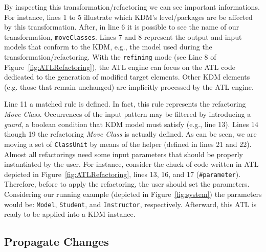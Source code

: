 By inspecting this transformation/refactoring we can see important informations. For instance, lines 1 to 5 illustrate which KDM's level/packages are be affected by this transformation.  After, in line 6 it is possible to see the name of our transformation, \texttt{moveClasses}. Lines 7 and 8 represent the output and input models that conform to the KDM, e.g., the model used during the transformation/refactoring. 
%
With the \texttt{refining} mode (see Line 8 of Figure~\ref{fig:ATLRefactoring}), the ATL engine can focus on the ATL code dedicated to the generation of modified target elements. Other KDM elements (e.g. those that remain unchanged) are implicitly processed by the ATL engine.


Line 11 a matched rule is defined. In fact, this rule represents the refactoring \textit{Move Class}. Occurrences of the input pattern may be filtered by introducing a \textit{guard}, a boolean condition that KDM model must satisfy (e.g., line 13). Lines 14 though 19 the refactoring \textit{Move Class} is actually defined. As can be seen, we are moving a set of \texttt{ClassUnit} by means of the helper (defined in lines 21 and 22). 
Almost all refactorings need some input parameters that should be properly instantiated by the user. For instance, consider the chuck of code written in ATL depicted in Figure~\ref{fig:ATLRefactoring}, lines 13, 16, and 17 (\texttt{\#parameter}). Therefore, before to apply the refactoring, the user should set the parameters. Considering our running example (depicted in Figure~\ref{fig:system}) the parameters would be: \texttt{Model}, \texttt{Student}, and \texttt{Instructor}, respectively. Afterward, this ATL is ready to be applied into a KDM instance.




\subsection{Propagate Changes} %
\label{sub:apply_refactoring}

